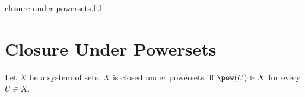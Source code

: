 \documentclass{naproche-library}
\begin{document}
\begin{smodule}{closure-under-powersets.ftl}

  \section*{Closure Under Powersets}

  \begin{definition}[forthel,id=FOUNDATIONS_14_4652013578120594,printid]
    Let $X$ be a system of sets.
    $X$ is closed under powersets iff $\pow(U) \in X$ for every $U \in X$.
  \end{definition}
\end{smodule}
\end{document}
